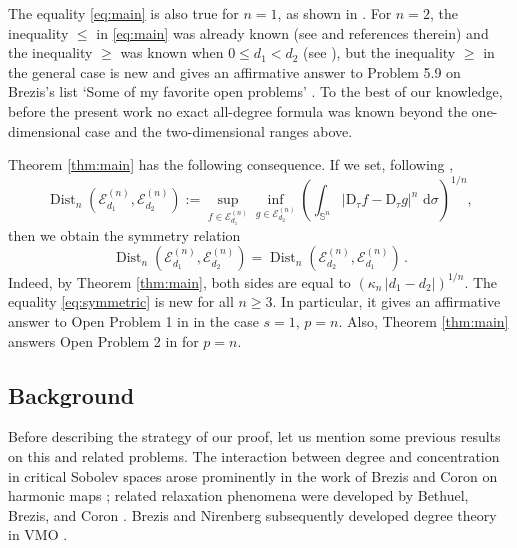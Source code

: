 \documentclass[11pt,reqno]{amsart}
\numberwithin{equation}{section}
\newtheorem{theorem}{Theorem}[section]
\newcommand{\Sph}{\mathbb S}
\newcommand{\Z}{\mathbb Z}
\newcommand{\E}{\mathcal E}
\newcommand{\D}{\mathrm D}
\newcommand{\dd}{\,\mathrm d}
\newcommand{\distdir}{\operatorname{Dist}}
\newcommand{\VMO}{\mathrm{VMO}}
\begin{document}

The equality \eqref{eq:main} is also true for $n=1$, as shown in \cite[Theorem 1.4(1)]{BrezisMironescuShafrir2016}. For $n=2$, the inequality $\leq$ in \eqref{eq:main} was already known (see \cite{Brezis2023} and references therein) and the inequality $\geq$ was known when $0\leq d_1<d_2$ (see \cite[Proposition 7.3(2)]{BrezisMironescuShafrir2016}), but the inequality $\geq$ in the general case is new and gives an affirmative answer to Problem 5.9 on Brezis's list `Some of my favorite open problems' \cite{Brezis2023}. To the best of our knowledge, before the present work no exact all-degree formula was known beyond the one-dimensional case and the two-dimensional ranges above.

Theorem \ref{thm:main} has the following consequence. If we set, following \cite{BrezisMironescuShafrir2016},
\begin{equation}
    \label{eq:directed-distance}
    \distdir_n(\E_{d_1}^{(n)},\E_{d_2}^{(n)})
  :=\sup_{f\in\E_{d_1}^{(n)}}
    \inf_{g\in\E_{d_2}^{(n)}} \left( \int_{\Sph^n}|\D_\tau f-\D_\tau g|^n\,\dd\sigma \right)^{1/n},
\end{equation}
then we obtain the symmetry relation
\begin{equation}
    \label{eq:symmetric}
    \distdir_n(\E_{d_1}^{(n)},\E_{d_2}^{(n)}) = \distdir_n(\E_{d_2}^{(n)},\E_{d_1}^{(n)}) \,.
\end{equation}
Indeed, by Theorem \ref{thm:main}, both sides are equal to $(\kappa_n \, |d_1-d_2|)^{1/n}$. The equality \eqref{eq:symmetric} is new for all $n\geq 3$. In particular, it gives an affirmative answer to Open Problem 1 in \cite{BrezisMironescuShafrir2016} in the case $s=1$, $p=n$. Also, Theorem \ref{thm:main} answers Open Problem 2 in \cite{BrezisMironescuShafrir2016} for $p=n$.


\subsection*{Background}
Before describing the strategy of our proof, let us mention some previous results on this and related problems. The interaction between degree and concentration in critical Sobolev spaces arose prominently in the work of Brezis and Coron on harmonic maps \cite[Lemmas~1--2]{BrezisCoron1983}; related relaxation phenomena were developed by Bethuel, Brezis, and Coron \cite[Theorems~2--3]{BethuelBrezisCoron1990}.  Brezis and Nirenberg subsequently developed degree theory in $\VMO$ \cite[Section~I.3 and Theorem~1]{BrezisNirenberg1995}.
\end{document}
